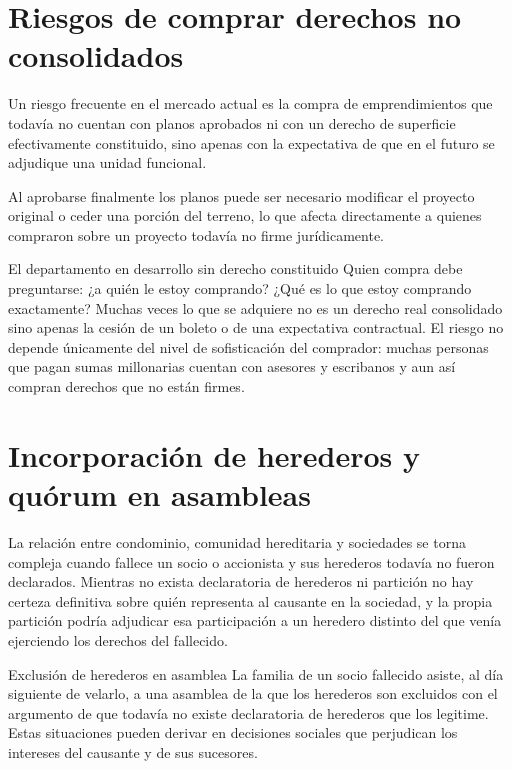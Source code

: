 \documentclass[12pt,oneside]{book}
\begin{document}
\section{Riesgos de comprar derechos no consolidados}
\label{sec:noconsolidados}

Un riesgo frecuente en el mercado actual es la compra de emprendimientos que todavía no cuentan con planos aprobados ni con un derecho de superficie efectivamente constituido, sino apenas con la expectativa de que en el futuro se adjudique una unidad funcional.

\begin{important}
Al aprobarse finalmente los planos puede ser necesario modificar el proyecto original o ceder una porción del terreno, lo que afecta directamente a quienes compraron sobre un proyecto todavía no firme jurídicamente.
\end{important}

\begin{example}{El departamento en desarrollo sin derecho constituido}
Quien compra debe preguntarse: ¿a quién le estoy comprando? ¿Qué es lo que estoy comprando exactamente? Muchas veces lo que se adquiere no es un derecho real consolidado sino apenas la cesión de un boleto o de una expectativa contractual. El riesgo no depende únicamente del nivel de sofisticación del comprador: muchas personas que pagan sumas millonarias cuentan con asesores y escribanos y aun así compran derechos que no están firmes.
\end{example}

\section{Incorporación de herederos y quórum en asambleas}
\label{sec:herederos}

La relación entre condominio, comunidad hereditaria y sociedades se torna compleja cuando fallece un socio o accionista y sus herederos todavía no fueron declarados. Mientras no exista declaratoria de herederos ni partición no hay certeza definitiva sobre quién representa al causante en la sociedad, y la propia partición podría adjudicar esa participación a un heredero distinto del que venía ejerciendo los derechos del fallecido.

\begin{example}{Exclusión de herederos en asamblea}
La familia de un socio fallecido asiste, al día siguiente de velarlo, a una asamblea de la que los herederos son excluidos con el argumento de que todavía no existe declaratoria de herederos que los legitime. Estas situaciones pueden derivar en decisiones sociales que perjudican los intereses del causante y de sus sucesores.
\end{example}
\end{document}

